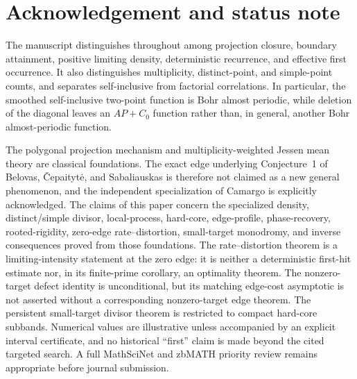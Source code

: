\documentclass[11pt]{article}
\theoremstyle{definition}
\theoremstyle{remark}
\begin{document}
{}
\section*{Acknowledgement and status note}

The manuscript distinguishes throughout among projection closure, boundary
attainment, positive limiting density, deterministic recurrence, and effective
first occurrence.  It also distinguishes multiplicity, distinct-point, and
simple-point counts, and separates self-inclusive from factorial correlations.
In particular, the smoothed self-inclusive two-point function is Bohr almost
periodic, while deletion of the diagonal leaves an $AP+C_0$ function rather
than, in general, another Bohr almost-periodic function.

The polygonal projection mechanism and multiplicity-weighted Jessen mean theory
are classical foundations.  The exact edge underlying Conjecture~1 of Belovas,
\v{C}epaityt\.{e}, and Sabaliauskas is therefore not claimed as a new general
phenomenon, and the independent specialization of Camargo is explicitly
acknowledged.  The claims of this paper concern the specialized density,
distinct/simple divisor, local-process, hard-core, edge-profile, phase-recovery,
rooted-rigidity, zero-edge rate--distortion, small-target monodromy, and inverse
consequences proved from those foundations.  The rate--distortion theorem is a
limiting-intensity statement at the zero edge: it is neither a deterministic
first-hit estimate nor, in its finite-prime corollary, an optimality theorem.
The nonzero-target defect identity is unconditional, but its matching edge-cost
asymptotic is not asserted without a corresponding nonzero-target edge theorem.
The persistent small-target divisor theorem is restricted to compact hard-core
subbands.  Numerical values are illustrative unless accompanied by an explicit
interval certificate, and no historical ``first'' claim is made beyond the
cited targeted search.  A full MathSciNet and zbMATH priority review remains
appropriate before journal submission.
\end{document}
